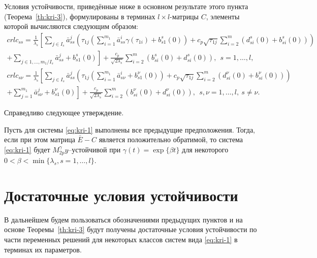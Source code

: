  Условия устойчивости, приведённые ниже в основном результате этого
пункта (Теорема~\ref{th:kri-3}), формулированы в терминах $l\times l$-матрицы
$C$, элементы которой вычисляются следующим образом:
\begin{multline*}{crl}
c_{ss} = \frac{1}{\lambda _s } \left [\sum \limits_{j \in I_s} \bar
a^{j}_{ss}\left (\tau _{1j}
 \left (\sum \limits_{i=1}^{m_1}\bar a^{i}_{ss} \gamma (\tau
 _{1i})
 + b^s_{s1}(0)\right ) +
c_p\sqrt{\tau _{1j}} \sum\limits_{i
=2}^{m}(d^s_{si}(0) + b^s_{si}(0))\right )\right .\\
\left . +\sum\limits_{j \in {1,\dots,m_1}/ I_s} \bar a^{j}_{ss} +
b^s_{s1}(0)\right ] + \frac{c_p}{\sqrt{2\lambda_s }}
\sum\limits_{i=2}^{m} (b^s_{si}(0) + d^s_{si} (0)), \ \  s =
1,\dots,l,
\end{multline*}
\begin{multline*}{crl}
c_{s\nu} = \frac{1}{\lambda _s } \left [\sum \limits_{j \in I_s}
\bar a^{j}_{ss}\left (\tau _{1j}
 \left (\sum \limits_{i=1}^{m_1}\bar a^{i}_{s\nu} + b^\nu_{s1}(0)\right ) +
c_p\sqrt{\tau _{1j}} \sum\limits_{i
=2}^{m}(d^\nu_{si}(0) + b^\nu_{si}(0))\right )\right .\\
\left . +\sum\limits_{j =1}^{m_1} \bar a^{j}_{s\nu} +
b^\nu_{s1}(0)\right ] + \frac{c_p}{\sqrt{2\lambda_s }}
\sum\limits_{i=2}^{m} (b^\nu_{si}(0) +d^\nu_{si} (0)), \ \ s,\nu =
1,\dots,l, \ s \neq \nu.
\end{multline*}

Справедливо следующее утверждение.

\begin{theorem}\label{th:kri-3}
    Пусть для системы \eqref{eq:kri-1} выполнены все
    предыдущие предположения. Тогда, если при этом матрица $\bar E - C$
    является положительно обратимой, то система \eqref{eq:kri-1} будет $M_{2p}^\gamma
    y$--устойчивой при $\gamma (t) = \exp \{\beta t\}$ для некоторого
    $0<\beta < \min \{\lambda _s, s = 1, \dots, l \}$.
\end{theorem}


\section{Достаточные условия устойчивости}

В дальнейшем
будем пользоваться обозначениями предыдущих пунктов и на основе
Теоремы~\ref{th:kri-3} будут получены достаточные условия устойчивости по части
переменных решений для некоторых классов систем вида \eqref{eq:kri-1} в терминах
их параметров.

